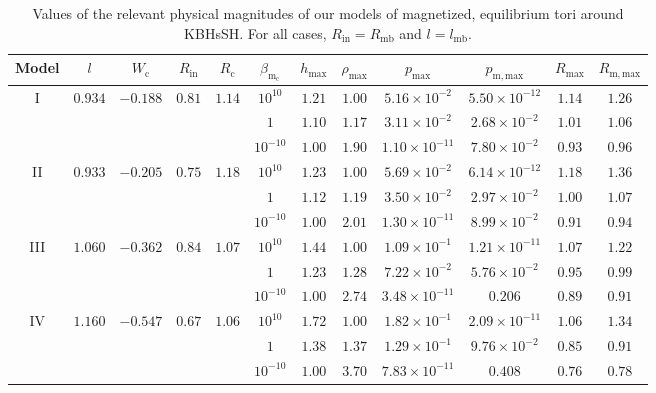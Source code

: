 \documentclass[twocolumn,aps,showpacs,showkeys,prd,superscriptaddress,byrevtex, amsmath]{revtex4-1}
\begin{document}
\begin{table}[t]
\caption{Values of the relevant physical magnitudes of our models of magnetized, equilibrium tori around KBHsSH. For all cases,  $R_{\mathrm{in}} = R_{\mathrm{mb}}$ and $l = l_{\mathrm{mb}}$.}       
\label{HBH_disk_parameters}      
\centering          
\begin{tabular}{c c c c c  c c c c c c c}
\hline\hline       
 Model & $l$ & $W_{\mathrm{c}}$ & $R_{\mathrm{in}}$ & $R_{\mathrm{c}}$ &  $\beta_{\mathrm{m_{\mathrm{c}}}}$ & $h_{\mathrm{max}}$ & $\rho_{\mathrm{max}}$ & $p_{\mathrm{max}}$ & $p_{\mathrm{m, max}}$ & $R_{\mathrm{max}}$ & $R_{\mathrm{m, max}}$\\ 
\hline           
I & $0.934$ & $-0.188$ & $0.81$ & $1.14$ & $10^{10}$ & $1.21$ & $1.00$ & $5.16 \times 10^{-2}$ & $5.50 \times 10^{-12}$ & $1.14$ & $1.26$\\ 
 \hline 
 &  &  &  &  & $1$ & $1.10$ & $1.17$ & $3.11 \times 10^{-2}$ & $2.68 \times 10^{-2}$ & $1.01$ & $1.06$\\ 
 \hline 
 &  &  &  &  & $10^{-10}$ & $1.00$ & $1.90$ & $1.10 \times 10^{-11}$ & $7.80 \times 10^{-2}$ & $0.93$ & $0.96$\\ 
 \hline 
II & $0.933$ & $-0.205$ & $0.75$ & $1.18$ & $10^{10}$ & $1.23$ & $1.00$ & $5.69 \times 10^{-2}$ & $6.14 \times 10^{-12}$ & $1.18$ & $1.36$\\ 
 \hline 
 &  &  &  &  & $1$ & $1.12$ & $1.19$ & $3.50 \times 10^{-2}$ & $2.97 \times 10^{-2}$ & $1.00$ & $1.07$\\ 
 \hline 
 &  &  &  &  & $10^{-10}$ & $1.00$ & $2.01$ & $1.30 \times 10^{-11}$ & $8.99 \times 10^{-2}$ & $0.91$ & $0.94$ \\ 
 \hline 
III & $1.060$ & $-0.362$ & $0.84$ & $1.07$ & $10^{10}$ & $1.44$ & $1.00$ & $1.09 \times 10^{-1}$ & $1.21 \times 10^{-11}$ & $1.07$ & $1.22$\\ 
 \hline 
 &  &  &  &  & $1$ & $1.23$ & $1.28$ & $7.22 \times 10^{-2}$ & $5.76 \times 10^{-2}$ & $0.95$ & $0.99$ \\ 
 \hline 
 &  &  &  &  & $10^{-10}$ & $1.00$ & $2.74$ & $3.48 \times 10^{-11}$ & $0.206$ & $0.89$ & $0.91$\\ 
\hline  
IV & $1.160$ & $-0.547$ & $0.67$ & $1.06$ & $10^{10}$ & $1.72$ & $1.00$ & $1.82\times 10^{-1}$ & $2.09 \times 10^{-11}$ & $1.06$ & $1.34$ \\ 
\hline 
 &  &  &  &  & $1$ & $1.38$ & $1.37$ & $1.29 \times 10^{-1}$ & $9.76 \times 10^{-2}$ & $0.85$ & $0.91$\\ 
\hline 
 &  &  &  &  & $10^{-10}$ & $1.00$ & $3.70$ & $7.83 \times 10^{-11}$ & $0.408$ & $0.76$ & $0.78$ \\ 

\end{tabular}
\end{table}
\end{document}
